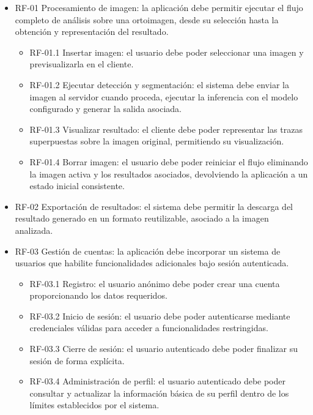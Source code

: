 \begin{itemize}
	\item RF-01 Procesamiento de imagen: la aplicación debe permitir ejecutar el flujo completo de análisis sobre una ortoimagen, desde su selección hasta la obtención y representación del resultado.
	\begin{itemize}
		\item RF-01.1 Insertar imagen: el usuario debe poder seleccionar una imagen y previsualizarla en el cliente.
		\item RF-01.2 Ejecutar detección y segmentación: el sistema debe enviar la imagen al servidor cuando proceda, ejecutar la inferencia con el modelo configurado y generar la salida asociada.
		\item RF-01.3 Visualizar resultado: el cliente debe poder representar las trazas superpuestas sobre la imagen original, permitiendo su visualización.
		\item RF-01.4 Borrar imagen: el usuario debe poder reiniciar el flujo eliminando la imagen activa y los resultados asociados, devolviendo la aplicación a un estado inicial consistente.
	\end{itemize}
	
	\item RF-02 Exportación de resultados: el sistema debe permitir la descarga del resultado generado en un formato reutilizable, asociado a la imagen analizada.
	
	\item RF-03 Gestión de cuentas: la aplicación debe incorporar un sistema de usuarios que habilite funcionalidades adicionales bajo sesión autenticada.
	\begin{itemize}
		\item RF-03.1 Registro: el usuario anónimo debe poder crear una cuenta proporcionando los datos requeridos.
		\item RF-03.2 Inicio de sesión: el usuario debe poder autenticarse mediante credenciales válidas para acceder a funcionalidades restringidas.
		\item RF-03.3 Cierre de sesión: el usuario autenticado debe poder finalizar su sesión de forma explícita.
		\item RF-03.4 Administración de perfil: el usuario autenticado debe poder consultar y actualizar la información básica de su perfil dentro de los límites establecidos por el sistema.
	\end{itemize}
	

\end{itemize}
